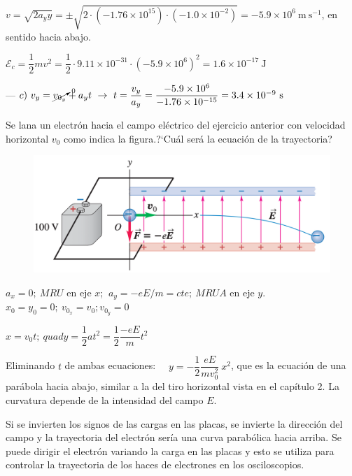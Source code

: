 $v=\sqrt{2a_y y}=\pm \sqrt{2\cdot (-1.76\times 10^{15}) \cdot (-1.0 \times 10^{-2})}=- 5.9\times 10^6 \ \mathrm{m\ s}^{-1}$, en sentido hacia abajo.

$\mathcal E_c=\dfrac 1 2 m v^2=\dfrac 1 2  \cdot 9.11\times 10^{-31} \cdot (-5.9 \times 10^6)^2 =1.6\times 10^{-17}\ \mathrm{J}$

--- $c)\ v_y=\cancelto{0}{v_{0_y}} +a_y t \  \to \ t=\dfrac{v_y}{a_y}=\dfrac{-5.9\times 10^6}{-1.76\times 10^{-15}}=3.4\times 10^{-9}\ \mathrm{s}$

\begin{prob}
Se lana un electrón hacia el campo eléctrico del ejercicio anterior con velocidad horizontal $v_0$ como indica la figura.?`Cuál será la ecuación de la trayectoria?	
\begin{figure}[H]
	\centering
	\includegraphics[width=.9\textwidth]{imagenes/imagenes22/T22IM20.png}
\end{figure}
\end{prob}

$a_x=0;\ MRU$ en eje $x$;  $\ a_y=-eE/m=cte;\ MRUA$ en eje $y$. $x_0=y_0=0;\ v_{0_x}=v_0; v_{0_y}=0$

$x=v_0t;\ quad y=\dfrac 1 2 a t^2=\dfrac 1 2 \dfrac{-eE}{m} t^2$

Eliminando $t$ de ambas ecuaciones: $\quad y=-\dfrac 1 2 \dfrac{eE}{mv_0^2}\ x^2$, que es la ecuación de una parábola hacia abajo, similar a la del tiro horizontal vista en el capítulo 2. La curvatura depende de la intensidad del campo $E$.

Si se invierten los signos de las cargas en las placas, se invierte la dirección del campo y la trayectoria del electrón sería una curva parabólica hacia arriba. Se puede dirigir el electrón variando la carga en las placas y esto se utiliza para controlar la trayectoria de los haces de electrones en los osciloscopios.

